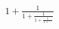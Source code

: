 \documentclass[preview]{standalone}
\begin{document}
\begin{align*}
{1 + \displaystyle\frac{1}{1 + \displaystyle \frac{1}{1 + \frac{1}{1 + \cdots } } } }
\end{align*}
\end{document}

